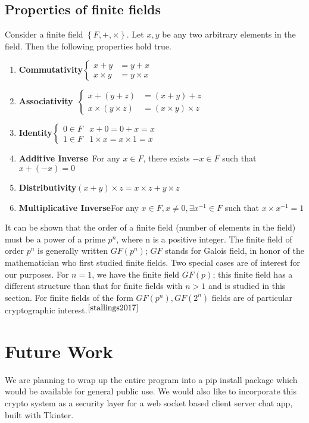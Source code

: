 \documentclass[a4paper,12pt]{article}
\begin{document}
\subsection{Properties of finite fields}
\begin{flushleft}
Consider a finite field $\left\{F,+,\times\right\}$. Let $x,y$ be any two arbitrary elements in the field. Then the following properties hold true.
\begin{enumerate}
	\item \textbf{Commutativity}\qquad\quad $\begin{cases}x+y&=y+x\\x\times y&=y\times x\end{cases}$
	\item \textbf{Associativity}\qquad\qquad\, $\begin{cases}x+(y+z)&=(x+y)+z\\x\times(y\times z)&=(x\times y)\times z\end{cases}$
	\item \textbf{Identity}\qquad\qquad\qquad\quad $\begin{cases}0\in F& x+0=0+x=x\\1\in F&1\times x=x\times 1=x\end{cases}$
	\item \textbf{Additive Inverse}\qquad\quad\, For any $x\in F$, there exists $-x\in F$ such that $x+(-x)=0$
	\item \textbf{Distributivity}\qquad\qquad\quad $(x+y)\times z=x\times z+y\times z$
	\item \textbf{Multiplicative Inverse}\quad For any $x\in F,x\neq 0, \exists x^{-1}\in F$ such that $x\times x^{-1}=1$
\end{enumerate}
\end{flushleft}

\begin{flushleft}
It can be shown that the order of a finite field (number of elements in the field) must be a power of a prime $p^n$, where n is a positive integer. The finite field of order $p^n$ is generally written $GF(p^n)$; $GF$ stands for Galois field, in honor of the mathematician who first studied finite fields. Two special cases are of interest for our purposes. For $n = 1$, we have the finite field $GF(p)$; this finite field has a different structure than that for finite fields with $n>1$ and is studied in this section. For finite fields of the form $GF(p^n), GF(2^n)$ fields are of particular cryptographic interest.${^{\cite{stallings2017}}}$
\end{flushleft}

\section{Future Work}
\begin{flushleft}
We are planning to wrap up the entire program into a pip install package which would be available for general public use. We would also like to incorporate this crypto system as a security layer for a web socket based client server chat app, built with Tkinter.
\end{flushleft}
\newpage


\end{document}
